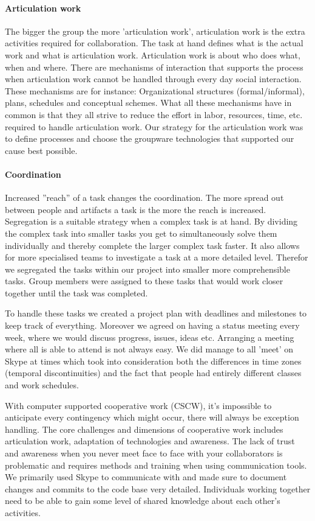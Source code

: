 \paragraph{Articulation work} \label{par:articulationwork}
The bigger the group the more 'articulation work', articulation work is the extra activities required for collaboration. The task at hand defines what is the actual work and what is articulation work. Articulation work is about who does what, when and where. There are mechanisms of interaction that supports the process when articulation work cannot be handled through every day social interaction. These mechanisms are for instance: Organizational structures (formal/informal), plans, schedules and conceptual schemes. What all these mechanisms have in common is that they all strive to reduce the effort in labor, resources, time, etc. required to handle articulation work. 
Our strategy for the articulation work was to define processes and choose the groupware technologies that supported our cause best possible. 

\paragraph{Coordination} \label{par:coordination}
Increased ''reach'' of a task changes the coordination. The more spread out between people and artifacts a task is the more the reach is increased. Segregation is a suitable strategy when a complex task is at hand. By dividing the complex task into smaller tasks you get to simultaneously solve them individually and thereby complete the larger complex task faster. It also allows for more specialised teams to investigate a task at a more detailed level. Therefor we segregated the tasks within our project into smaller more comprehensible tasks. Group members were assigned to these tasks that would work closer together until the task was completed. 

To handle these tasks we created a project plan with deadlines and milestones to keep track of everything. Moreover we agreed on having a status meeting every week, where we would discuss progress, issues, ideas etc. Arranging a meeting where all is able to attend is not always easy. We did manage to all 'meet' on Skype at times which took into consideration both the differences in time zones (temporal discontinuities) and the fact that people had entirely different classes and work schedules.

With computer supported cooperative work (CSCW), it's impossible to anticipate every contingency which might occur, there will always be exception handling. The core challenges and dimensions of cooperative work includes articulation work, adaptation of technologies and awareness. The lack of trust and awareness when you never meet face to face with your collaborators is problematic and requires methods and training when using communication tools. We primarily used Skype to communicate with and made sure to document changes and commits to the code base very detailed. Individuals working together need to be able to gain some level of shared knowledge about each other's activities.


